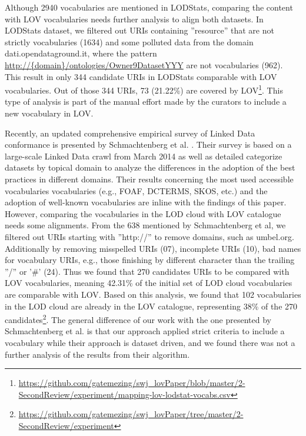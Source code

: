 \documentclass{iosart2c}
\begin{document}
Although 2940 vocabularies are mentioned in LODStats, comparing the content with LOV vocabularies needs further analysis to align both datasets. In LODStats dataset, we filtered out URIs containing ''resource'' that are not strictly vocabularies (1634) and some polluted data from the domain dati.opendataground.it, where the pattern \url{http://{domain}/ontologies/Owner9DatasetYYY} are not vocabularies (962). This result in only 344 candidate URIs in LODStats comparable with LOV vocabularies. Out of those 344 URIs, 73 (21.22\%) are covered by LOV\footnote{\url{https://github.com/gatemezing/swj_lovPaper/blob/master/2-SecondReview/experiment/mapping-lov-lodstat-vocabs.csv}}. This type of analysis is part of the manual effort made by the curators to include a new vocabulary in LOV.

Recently, an updated comprehensive empirical survey of Linked Data conformance is presented by Schmachtenberg et al. \cite{max2014}. Their survey is based on a large-scale Linked Data crawl from March 2014 as well as detailed categorize datasets by topical domain to analyze the differences in the adoption of the best practices in different domains. Their results concerning the most used accessible vocabularies vocabularies (e.g., FOAF, DCTERMS, SKOS, etc.) and the adoption of well-known vocabularies are inline with the findings of this paper. However, comparing the vocabularies in the LOD cloud with LOV catalogue needs some alignments. From the 638 mentioned by Schmachtenberg et al, we filtered out URIs starting with ''http://'' to remove domains, such as umbel.org. Additionally by removing misspelled URIs (07), incomplete URIs (10), bad names for vocabulary URIs, e.g., those finishing by different character than the trailing ''/'' or '\#' (24). Thus we found that 270 candidates URIs to be compared with LOV vocabularies, meaning 42.31\% of the initial set of LOD cloud vocabularies are comparable with LOV. Based on this analysis, we found that 102 vocabularies in the LOD cloud are already in the LOV catalogue, representing 38\% of the 270 candidates\footnote{\url{https://github.com/gatemezing/swj_lovPaper/tree/master/2-SecondReview/experiment}}. The general difference of our work with the one presented by Schmachtenberg et al. is that our approach applied strict criteria to include a vocabulary while their approach is dataset driven, and we found there was not a further analysis of the results from their algorithm.
\end{document}
